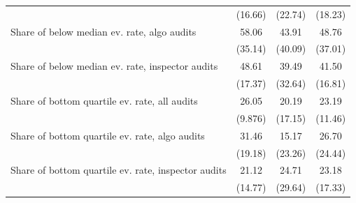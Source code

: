 {\begin{tabular}{l*{3}{c}}
            &     (16.66)         &     (22.74)         &     (18.23)         \\
Share of below median ev. rate, algo audits&       58.06         &       43.91         &       48.76         \\
            &     (35.14)         &     (40.09)         &     (37.01)         \\
Share of below median ev. rate, inspector audits&       48.61         &       39.49         &       41.50         \\
            &     (17.37)         &     (32.64)         &     (16.81)         \\
Share of bottom quartile ev. rate, all audits&       26.05         &       20.19         &       23.19         \\
            &     (9.876)         &     (17.15)         &     (11.46)         \\
Share of bottom quartile ev. rate, algo audits&       31.46         &       15.17         &       26.70         \\
            &     (19.18)         &     (23.26)         &     (24.44)         \\
Share of bottom quartile ev. rate, inspector audits&       21.12         &       24.71         &       23.18         \\
            &     (14.77)         &     (29.64)         &     (17.33)         \\
\bottomrule
\end{tabular}
}

